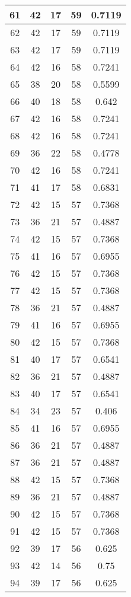 \documentclass[letterpaper, 12pt]{article}
\begin{document}
\begin{longtable}{|c|c|c|c|c|}
\hline
61 & 42 & 17 & 59 & 0.7119 \\
\hline
62 & 42 & 17 & 59 & 0.7119 \\
\hline
63 & 42 & 17 & 59 & 0.7119 \\
\hline
64 & 42 & 16 & 58 & 0.7241 \\
\hline
65 & 38 & 20 & 58 & 0.5599 \\
\hline
66 & 40 & 18 & 58 & 0.642 \\
\hline
67 & 42 & 16 & 58 & 0.7241 \\
\hline
68 & 42 & 16 & 58 & 0.7241 \\
\hline
69 & 36 & 22 & 58 & 0.4778 \\
\hline
70 & 42 & 16 & 58 & 0.7241 \\
\hline
71 & 41 & 17 & 58 & 0.6831 \\
\hline
72 & 42 & 15 & 57 & 0.7368 \\
\hline
73 & 36 & 21 & 57 & 0.4887 \\
\hline
74 & 42 & 15 & 57 & 0.7368 \\
\hline
75 & 41 & 16 & 57 & 0.6955 \\
\hline
76 & 42 & 15 & 57 & 0.7368 \\
\hline
77 & 42 & 15 & 57 & 0.7368 \\
\hline
78 & 36 & 21 & 57 & 0.4887 \\
\hline
79 & 41 & 16 & 57 & 0.6955 \\
\hline
80 & 42 & 15 & 57 & 0.7368 \\
\hline
81 & 40 & 17 & 57 & 0.6541 \\
\hline
82 & 36 & 21 & 57 & 0.4887 \\
\hline
83 & 40 & 17 & 57 & 0.6541 \\
\hline
84 & 34 & 23 & 57 & 0.406 \\
\hline
85 & 41 & 16 & 57 & 0.6955 \\
\hline
86 & 36 & 21 & 57 & 0.4887 \\
\hline
87 & 36 & 21 & 57 & 0.4887 \\
\hline
88 & 42 & 15 & 57 & 0.7368 \\
\hline
89 & 36 & 21 & 57 & 0.4887 \\
\hline
90 & 42 & 15 & 57 & 0.7368 \\
\hline
91 & 42 & 15 & 57 & 0.7368 \\
\hline
92 & 39 & 17 & 56 & 0.625 \\
\hline
93 & 42 & 14 & 56 & 0.75 \\
\hline
94 & 39 & 17 & 56 & 0.625 \\

\end{longtable}
\end{document}
